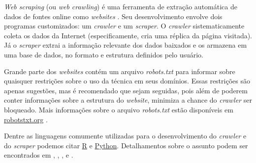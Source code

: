 \documentclass{automatextcc}
\begin{document}


\textit{Web scraping} (ou \textit{web crawling}) é uma ferramenta de extração automática de dados de fontes online como \textit{websites} \citep{farley2017,khder2021}. Seu desenvolvimento envolve dois programas customizados: um \textit{crawler} e um \textit{scraper}. O \textit{crawler} sistematicamente coleta os dados da Internet (especificamente, cria uma réplica da página visitada). Já o \textit{scraper} extrai a informação relevante dos dados baixados e os armazena em uma base de dados, no formato e estrutura definidos pelo usuário. \citep{lawson2015,patil2016}

Grande parte dos \textit{websites} contém um arquivo \textit{robots.txt} para informar sobre quaisquer restrições sobre o uso da técnica em seus domínios. Essas restrições são apenas sugestões, mas é recomendado que sejam seguidas, pois além de poderem conter informações sobre a estrutura do \textit{website}, minimiza a chance do \textit{crawler} ser bloqueado. Mais informações sobre o arquivo \textit{robots.txt} estão disponíveis em \url{robotstxt.org} \citep{lawson2015}.

Dentre as linguagens comumente utilizadas para o desenvolvimento do \textit{crawler} e do \textit{scraper} podemos citar \href{https://cran.r-project.org}{R} e \href{https://python.org/}{Python}. Detalhamentos sobre o assunto podem ser encontrados em \citet{lawson2015}, \citet{sirisuriya2015}, \citet{patil2016}, \citet{farley2017} e \citet{khder2021}.
\end{document}

